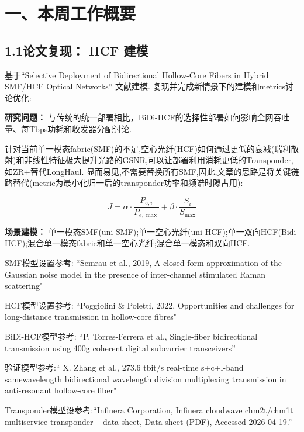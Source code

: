 \documentclass{sjtuweekly}
\begin{document}
\makeweeklytitle

\section{一、本周工作概要}

\subsection*{1.1\quad 论文复现： HCF 建模}

基于``Selective Deployment of Bidirectional Hollow-Core Fibers in Hybrid SMF/HCF Optical Networks'' 文献建模. 复现并完成新情景下的建模和metrics讨论优化:


\textbf{研究问题：} 
与传统的统一部署相比，BiDi-HCF的选择性部署如何影响全网吞吐量、每Tbps功耗和收发器分配讨论.

针对当前单一模态fabric(SMF)的不足,空心光纤(HCF)如何通过更低的衰减(瑞利散射)和非线性特征极大提升光路的GSNR,可以让部署利用消耗更低的Transponder,如ZR+替代LongHaul. 显而易见,不需要替换所有SMF,因此,文章的思路是将关键链路替代(metric为最小化归一后的transponder功率和频谱时隙占用):

\begin{equation}
  J = \alpha \cdot \frac{P_{e,i}}{P_{e,\max}} + \beta \cdot \frac{S_i}{S_{\max}}
  \label{objective_function}
\end{equation}

\textbf{场景建模：} 
单一模态SMF(uni-SMF);单一空心光纤(uni-HCF);单一双向HCF(Bidi-HCF);混合单一模态fabric和单一空心光纤;混合单一模态和双向HCF.

SMF模型设置参考: ``Semrau et al., 2019, A closed-form approximation of the Gaussian noise model in the presence of inter-channel stimulated Raman scattering"

HCF模型设置参考: ``Poggiolini & Poletti, 2022, Opportunities and challenges for long-distance transmission in hollow-core fibres"

BiDi-HCF模型参考: ``P. Torres-Ferrera et al., Single-fiber bidirectional transmission using 400g coherent digital subcarrier transceivers''

验证模型参考:`` X. Zhang et al., 273.6 tbit/s real-time s+c+l-band samewavelength bidirectional wavelength division multiplexing transmission in anti-resonant hollow-core fiber"

Transponder模型设参考:``Infinera Corporation, Infinera cloudwave chm2t/chm1t multiservice transponder – data sheet, Data sheet (PDF), Accessed 2026-04-19.''
\end{document}
